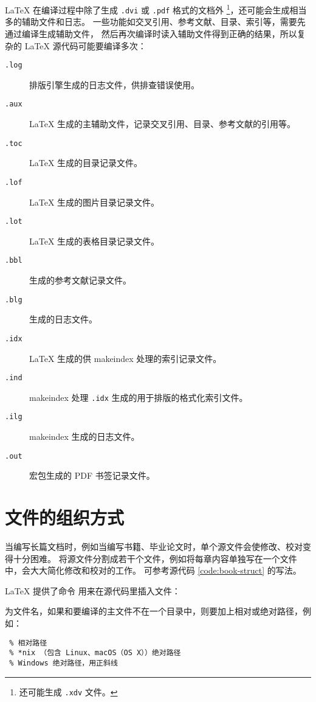 \LaTeX{} 在编译过程中除了生成 \texttt{.dvi} 或 \texttt{.pdf} 格式的文档外%
\footnote{ 还可能生成 \texttt{.xdv} 文件。}，还可能会生成相当多的辅助文件和日志。
一些功能如交叉引用、参考文献、目录、索引等，需要先通过编译生成辅助文件，
然后再次编译时读入辅助文件得到正确的结果，所以复杂的 \LaTeX{} 源代码可能要编译多次：
\begin{description}
  \item[\texttt{.log}] 排版引擎生成的日志文件，供排查错误使用。
  \item[\texttt{.aux}] \LaTeX{} 生成的主辅助文件，记录交叉引用、目录、参考文献的引用等。
  \item[\texttt{.toc}] \LaTeX{} 生成的目录记录文件。
  \item[\texttt{.lof}] \LaTeX{} 生成的图片目录记录文件。
  \item[\texttt{.lot}] \LaTeX{} 生成的表格目录记录文件。
  \item[\texttt{.bbl}]  生成的参考文献记录文件。
  \item[\texttt{.blg}]  生成的日志文件。
  \item[\texttt{.idx}] \LaTeX{} 生成的供 makeindex 处理的索引记录文件。
  \item[\texttt{.ind}] makeindex 处理 \texttt{.idx} 生成的用于排版的格式化索引文件。
  \item[\texttt{.ilg}] makeindex 生成的日志文件。
  \item[\texttt{.out}]  宏包生成的 PDF 书签记录文件。
\end{description}

\section{文件的组织方式}\label{sec:latex-multi-files}

当编写长篇文档时，例如当编写书籍、毕业论文时，单个源文件会使修改、校对变得十分困难。
将源文件分割成若干个文件，例如将每章内容单独写在一个文件中，会大大简化修改和校对的工作。
可参考源代码 \ref{code:book-struct} 的写法。

\LaTeX{} 提供了命令  用来在源代码里插入文件：
\begin{command}
\end{command}
 为文件名，如果和要编译的主文件不在一个目录中，则要加上相对或绝对路径，例如：
\begin{verbatim}
 % 相对路径
 % *nix （包含 Linux、macOS（OS X））绝对路径
 % Windows 绝对路径，用正斜线
\end{verbatim}

